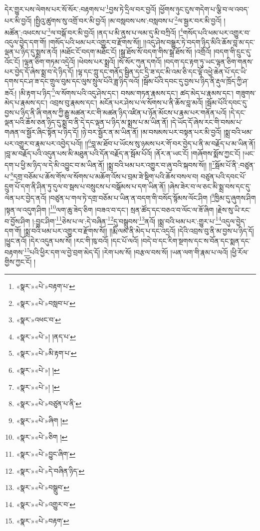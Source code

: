 དེར་གྱུར་པས་ལེགས་པར་སོ་སོར་:བརྟགས་པ་\footnote{«སྣར་»«པེ་»བརྟག་པ་}བྱས་ཏེ་དྲིལ་བར་བྱའོ། །ཕྱོགས་ཉུང་ངུས་གདེག་པ་ལྕི་བ་ལ་འབད་པར་མི་བྱའོ། །སྤྱིའུ་ཚུགས་སུ་འགྲོ་བར་མི་བྱའོ། །མ་བསླབས་པས་:བསླབས་པ་\footnote{«སྣར་»«པེ་»བསླབ་པ་}ལ་སྦྱར་བར་མི་བྱའོ། །མཚོན་:འཕངས་པ་\footnote{«སྣར་»འཕང་བ་}ལ་བསྒོ་བར་མི་བྱའོ། །ནད་པ་མི་ནུས་པ་ལམ་དུ་མི་བཀྲིའོ། །\footnote{«སྣར་»«པེ་»། །ནད་པ་}གསོད་པའི་ཕམ་པར་འགྱུར་བ་འདུལ་བྱེད་དག་གོ། །གསོད་པའི་ཕམ་པར་འགྱུར་བ་རྫོགས་སོ།། །།འདུ་ཤེས་བསྒྱུར་ཏེ་བདག་ཉིད་མིའི་ཆོས་བླ་མ་དང་ལྡན་པ་ཉིད་དུ་སྨྲས་ནའོ། །མཐོང་ངོ་བདག་མཐོང་ངོ། །སྒྲ་ཐོས་སོ་བདག་གིས་སྒྲ་ཐོས་སོ། །འགྲོའོ། །བདག་གི་དྲུང་དུ་འོང་ངོ། །ལྷན་ཅིག་གཏམ་འདྲེའོ། །ཕེབས་པར་སྨྲའོ། །སོ་སོར་ཀུན་དགའོ། །བདག་དང་རྟག་ཏུ་ཡང་ལྷན་ཅིག་གནས་པར་བྱེད་དོ་ཞེས་སྨྲ་བ་དེ་ཉིད་དོ། །ལྷ་དང་ཀླུ་དང་གནོད་སྦྱིན་དང་དྲི་ཟ་དང་མི་འམ་ཅི་དང་ལྟོ་འཕྱེ་ཆེན་པོ་དང་ཡི་དགས་དང་ཤ་ཟ་དང་གྲུལ་བུམ་དང་ལུས་སྲུལ་པོའི་ཟླ་ཉིད་ལའོ། །སྦོམ་པོའི་དབང་དུ་བྱས་པ་ཉིད་ནི་རྡུལ་ཁྲོད་ཀྱི་ཤ་ཟའོ:། །མི་རྟག་པ་ཉིད་\footnote{«སྣར་»«པེ་»མི་རྟག་པ་}ལ་སོགས་པའི་འདུ་ཤེས་དང་། བསམ་གཏན་རྣམས་དང་། ཚད་མེད་པ་རྣམས་དང་། གཟུགས་མེད་པ་རྣམས་དང་། འབྲས་བུ་རྣམས་དང་། མངོན་པར་ཤེས་པ་ལ་སོགས་པ་ནི་ཆོས་བླ་མའོ། །སྦོམ་པོའི་དབང་དུ་བྱས་པ་ཉིད་ནི་ཞི་གནས་ཀྱི་རྒྱུ་མཚན་རང་གི་མཚན་ཉིད་འཛིན་པ་ཉོན་མོངས་པ་རྣམ་པར་གནོན་པའོ། །དེ་དང་ལྡན་པའི་ཆོས་ཅན་ཉིད་དུ་སྨྲ་བ་ནི་དེ་དང་ལྡན་པ་ཉིད་མ་སྨྲས་པ་མ་ཡིན་ནོ། །དེ་ཡོད་དོ་ཞེས་རང་གི་བསམ་པ་གཞན་ལ་སྦྱོར་ཞིང་སྟོན་པ་ཉིད་དོ། །ཉེ་བར་སྦྱོར་ན་མ་ཡིན་ནོ། །མ་བསམས་པར་བསྟན་པར་མི་བྱའོ། །སྨྲ་བའི་ཕམ་པར་འགྱུར་བ་རྣམ་པར་འབྱེད་པའོ།། །།\footnote{«སྣར་»«པེ་»། །}བླ་མ་ཐོབ་པ་ཡོངས་སུ་ཉམས་པར་གོ་བར་བྱེད་པ་ནི་མ་བརྗོད་པ་མ་ཡིན་ནོ། །བླ་མ་བརྗོད་པའི་འདུན་པས་མི་མཐུན་པའི་དོན་བརྗོད་ན་སྦོམ་པོའོ། །ནོར་ན་ཡང་ངོ། །གཞོགས་སྨོས་ཀྱང་ངོ། །ཡང་དག་པ་ཕྱི་མ་ཉིད་ལ་དེ་མི་འབྱུང་བ་མ་ཡིན་ནོ། །སྨྲ་བའི་ཕམ་པར་འགྱུར་བ་ཞུ་བའི་སྐབས་སོ།། །།\footnote{«སྣར་»«པེ་»། །}སྦོམ་པོ་ནི་:བཙུན་པ་\footnote{«སྣར་»«པེ་»བཙུན་པ་ནི་}དགྲ་བཅོམ་པ་ཆོས་གོས་ལ་སོགས་པ་མཆོག་འོས་པ་བྲམ་ཟེ་སྡིག་པའི་ཆོས་བསལ་བ། བཙུན་པའི་དབང་པོ་དྲུག་པོ་དག་ནི་ཤིན་ཏུ་དུལ་བ་སྦས་པ་བསྲུངས་པ་བསྒོམས་པ་དག་ཡིན་ནོ། །ཞེས་ཟེར་བ་ལ་ཅང་མི་སྨྲ་བས་དང་དུ་ལེན་པར་བྱེད་ནའོ། །བཙུན་པ་གལ་ཏེ་དགྲ་བཅོམ་པ་ཡིན་ན་བདག་གི་བསོད་སྙོམས་ལོང་ཤིག །\footnote{«སྣར་»«པེ་»ཞིག །}ཁྱིམ་དུ་ཞུགས་ཤིག །སྟན་ལ་འདུག་ཤིག །\footnote{«སྣར་»«པེ་»ཅིག །}ལག་ཆུ་ཟེད་ཅིག །བཟའ་བ་དང་། སྲན་ཚོད་དང་བཅའ་བ་ལོང་ལ་ཟོ་ཞིག །རྗེས་སུ་ཡི་རང་བ་བྱོས་ཤིག །:བྱུང་ཤིག་\footnote{«སྣར་»«པེ་»བྱུང་ཞིག་}ཅེས་པ་ལ་:དེ་བཞིན་\footnote{«སྣར་»«པེ་»དེ་བཞིན་ཉིད་}དུ་བསྒྲུབས་\footnote{«སྣར་»«པེ་»བསྒྲུབ་}ནའོ། །སྨྲ་བའི་ཕམ་པར་:གྱུར་པ་\footnote{«སྣར་»«པེ་»འགྱུར་བ་}འདུལ་བྱེད་དག་གོ། །སྨྲ་བའི་ཕམ་པར་འགྱུར་བ་རྫོགས་སོ།། །།རྨི་ལམ་ནི་མེད་པ་དང་འདྲའོ། །དེའི་འབྲས་བུ་ནི་མ་བྱས་པ་ཉིད་དོ། །ཕྱུང་ནའོ། །དེར་འདུན་པས་སོ། །རང་གི་ཁུ་བའོ། །དང་པོ་ལའོ། །བདེ་བ་དང་རིག་སྔགས་དང་ས་བོན་དང་སྨན་དང་བརྟགས་\footnote{«སྣར་»«པེ་»བརྟག་}པའི་ཕྱིར་དག་ལ་བྱེ་བྲག་མེད་དོ། །རེག་པས་སོ། །བརྩལ་བས་སོ། །ཡན་ལག་གི་རྣམ་པ་ལའོ། །ཕྱི་རོལ་གྱིས་ཀྱང་ངོ། །

